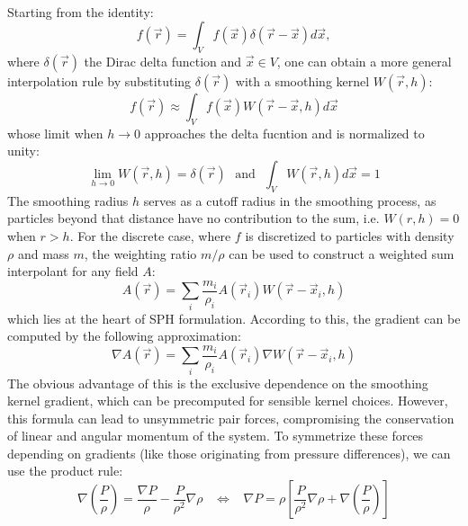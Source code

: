 \documentclass{llncs}
\begin{document}
\paragraph{} Starting from the identity:
\begin{equation*}
  f(\vec{r}) = \int_Vf(\vec{x}) \delta(\vec{r} - \vec{x}) d\vec{x},
\end{equation*}
where $\delta(\vec{r})$ the Dirac delta function and $\vec{x} \in V$, one can obtain a
more general interpolation rule by substituting $\delta(\vec{r})$ with a smoothing kernel
$W(\vec{r}, h)$:
\begin{equation*}
  \label{eq:c-approx}
  f(\vec{r}) \approx \int_V f(\vec{x}) W(\vec{r}-\vec{x}, h) d\vec{x}
\end{equation*}
whose limit when $h\to0$ approaches the delta fucntion and is normalized to unity:
\begin{equation*}
  \label{eq:kernel-properties}
  \lim_{h\to0}W(\vec{r}, h) = \delta(\vec{r})\ \ \
  \text{and}\ \ \
  \int_VW(\vec{r}, h) d\vec{x} = 1
\end{equation*}
The smoothing radius $h$ serves as a cutoff radius in the smoothing process, as particles
beyond that distance have no contribution to the sum, i.e. $W(r,h) = 0$ when $r>h$. For
the discrete case, where $f$ is discretized to particles with density $\rho$ and mass $m$,
the weighting ratio $m/\rho$ can be used to construct a weighted sum interpolant for any
field $A$:
\begin{equation}
  \label{eq:d-approx}
  A(\vec{r}) = \sum_i \frac{m_i}{\rho_i} A(\vec{r}_i) W(\vec{r}-\vec{x}_i, h)
\end{equation}
which lies at the heart of SPH formulation. According to this, the gradient can be
computed by the following approximation:
\begin{equation}
  \label{eq:d-grad}
  \nabla A(\vec{r}) = \sum_i \frac{m_i}{\rho_i} A(\vec{r}_i) \nabla W(\vec{r} - \vec{x}_i, h)
\end{equation}
The obvious advantage of this is the exclusive dependence on the smoothing kernel
gradient, which can be precomputed for sensible kernel choices. However, this formula can
lead to unsymmetric pair forces, compromising the conservation of linear and angular
momentum of the system. To symmetrize these forces depending on gradients (like those
originating from pressure differences), we can use the product rule:
\begin{equation*}
  \label{eq:grad-identity}
  \nabla \left( \frac{P}{\rho} \right) =
  \frac{\nabla P}{\rho}-
  \frac{P}{\rho^2} \nabla \rho
  \hspace{10pt} \Leftrightarrow \hspace{10pt}
  \nabla P = \rho \left[ \frac{P}{\rho^2} \nabla \rho + \nabla \left( \frac{P}{\rho}
    \right) \right]
\end{equation*}
\end{document}
